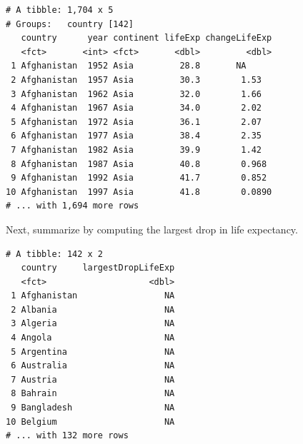 \documentclass[]{krantz}
\makeatletter
\newenvironment{Shaded}{\begin{snugshade}}{\end{snugshade}}
\newcommand{\DataTypeTok}[1]{\textcolor[rgb]{0.27,0.27,0.27}{#1}}
\newcommand{\KeywordTok}[1]{\textcolor[rgb]{0.27,0.27,0.27}{\textbf{#1}}}
\newcommand{\NormalTok}[1]{#1}
\newcommand{\OperatorTok}[1]{\textcolor[rgb]{0.43,0.43,0.43}{\textbf{#1}}}
\newcommand{\StringTok}[1]{\textcolor[rgb]{0.5,0.5,0.5}{#1}}
\newenvironment{kframe}{%
\medskip{}
\setlength{\fboxsep}{.8em}
 \def\at@end@of@kframe{}%
 \ifinner\ifhmode%
  \def\at@end@of@kframe{\end{minipage}}%
  \begin{minipage}{\columnwidth}%
 \fi\fi%
 \def\FrameCommand##1{\hskip\@totalleftmargin \hskip-\fboxsep
 \colorbox{shadecolor}{##1}\hskip-\fboxsep
     \hskip-\linewidth \hskip-\@totalleftmargin \hskip\columnwidth}%
 \MakeFramed {\advance\hsize-\width
   \@totalleftmargin\z@ \linewidth\hsize
   \@setminipage}}%
 {\par\unskip\endMakeFramed%
 \at@end@of@kframe}
\renewenvironment{Shaded}{\begin{kframe}}{\end{kframe}}
\makeatother
\begin{document}
\begin{verbatim}
# A tibble: 1,704 x 5
# Groups:   country [142]
   country      year continent lifeExp changeLifeExp
   <fct>       <int> <fct>       <dbl>         <dbl>
 1 Afghanistan  1952 Asia         28.8       NA     
 2 Afghanistan  1957 Asia         30.3        1.53  
 3 Afghanistan  1962 Asia         32.0        1.66  
 4 Afghanistan  1967 Asia         34.0        2.02  
 5 Afghanistan  1972 Asia         36.1        2.07  
 6 Afghanistan  1977 Asia         38.4        2.35  
 7 Afghanistan  1982 Asia         39.9        1.42  
 8 Afghanistan  1987 Asia         40.8        0.968 
 9 Afghanistan  1992 Asia         41.7        0.852 
10 Afghanistan  1997 Asia         41.8        0.0890
# ... with 1,694 more rows
\end{verbatim}

Next, summarize by computing the largest drop in life expectancy.

\begin{Shaded}
\end{Shaded}

\begin{verbatim}
# A tibble: 142 x 2
   country     largestDropLifeExp
   <fct>                    <dbl>
 1 Afghanistan                 NA
 2 Albania                     NA
 3 Algeria                     NA
 4 Angola                      NA
 5 Argentina                   NA
 6 Australia                   NA
 7 Austria                     NA
 8 Bahrain                     NA
 9 Bangladesh                  NA
10 Belgium                     NA
# ... with 132 more rows
\end{verbatim}
\end{document}
